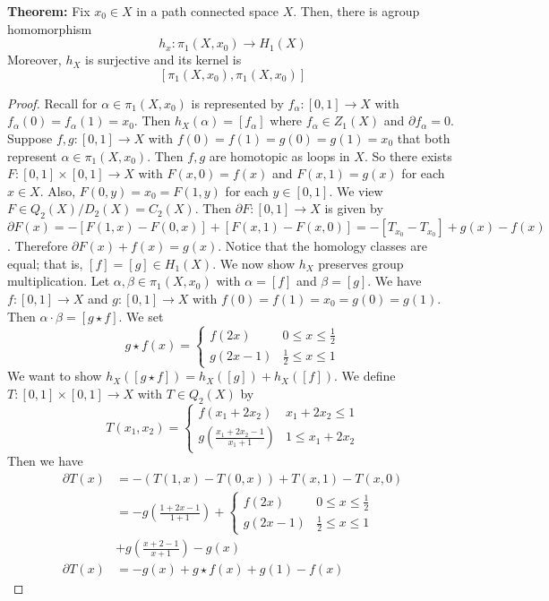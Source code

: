 \documentclass{article}
\begin{document}
\textbf{Theorem:} Fix $x_0 \in X$ in a path connected space $X$. Then, there is agroup homomorphism
\[
h_x: \pi_1(X, x_0) \to H_1(X)
\]
Moreover, $h_X$ is surjective and its kernel is
\[
[\pi_1(X, x_0), \pi_1(X, x_0)]
\]
\begin{proof}
Recall for $\alpha \in \pi_1(X, x_0)$ is represented by $f_\alpha:[0,1] \to X$ with $f_\alpha(0) = f_\alpha(1) = x_0$. Then $h_X(\alpha) = [f_\alpha]$ where $f_\alpha \in Z_1(X)$ and $\partial f_\alpha = 0$. Suppose $f,g : [0,1] \to X$ with $f(0) = f(1) = g(0) = g(1) = x_0$ that both represent $\alpha \in \pi_1(X,x_0)$. Then $f,g$ are homotopic as loops in $X$. So there exists $F:[0,1]\times[0,1] \to X$ with $F(x,0) = f(x)$ and $F(x,1) = g(x)$ for each $x \in X$. Also, $F(0,y) = x_0 = F(1,y)$ for each $y \in [0,1]$. We view $F \in Q_2(X)/D_2(X) = C_2(X)$. Then $\partial F: [0,1] \to X$ is given by $\partial F(x) = -[F(1,x) - F(0,x)] + [F(x,1) - F(x,0)] = -[T_{x_0} - T_{x_0}] + g(x) - f(x)$. Therefore $\partial F(x) + f(x) = g(x)$. Notice that the homology classes are equal; that is, $[f] = [g] \in H_1(X)$. We now show $h_X$ preserves group multiplication. Let $\alpha, \beta \in \pi_1(X, x_0)$ with $\alpha = [f]$ and $\beta = [g]$. We have $f:[0,1] \to X$ and $g:[0,1] \to X$ with $f(0) = f(1) = x_0 = g(0) = g(1)$. Then $\alpha \cdot \beta = [g \star f]$. We set
\[
g \star f(x) = \begin{cases}
f(2x) & 0 \leq x \leq \frac{1}{2} \\
g(2x - 1) & \frac{1}{2} \leq x \leq 1
\end{cases}
\]
We want to show $h_X([g \star f ]) = h_X([g]) + h_X([f])$. We define $T:[0,1] \times [0,1] \to X$ with $T \in Q_2(X)$ by
\[
T(x_1, x_2) = \begin{cases}
f(x_1 + 2x_2) & x_1 + 2x_2 \leq 1 \\
g(\frac{x_1 + 2x_2 - 1}{x_1 + 1}) & 1 \leq x_1 + 2x_2
\end{cases}
\]
Then we have 
\begin{align*}
\partial T(x) & = -(T(1,x) - T(0,x)) + T(x,1) - T(x,0) \\
& = -g(\frac{1 + 2x - 1}{1+1}) + \begin{cases}
f(2x) &  0 \leq x \leq \frac{1}{2} \\
g(2x - 1) & \frac{1}{2} \leq x \leq 1
\end{cases} \\
& + g(\frac{x+2-1}{x+1}) - g(x) \\
\partial T(x) & = -g(x) + g \star f(x) + g(1) - f(x) 
\end{align*}

\end{proof}
\end{document}
